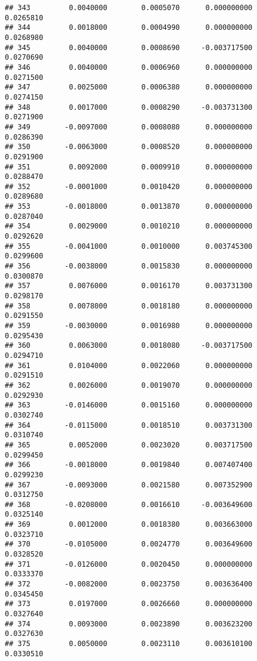 \documentclass[
]{article}
\begin{document}
\begin{verbatim}
## 343         0.0040000        0.0005070      0.000000000             0.0265810
## 344         0.0018000        0.0004990      0.000000000             0.0268980
## 345         0.0040000        0.0008690     -0.003717500             0.0270690
## 346         0.0040000        0.0006960      0.000000000             0.0271500
## 347         0.0025000        0.0006380      0.000000000             0.0274150
## 348         0.0017000        0.0008290     -0.003731300             0.0271900
## 349        -0.0097000        0.0008080      0.000000000             0.0286390
## 350        -0.0063000        0.0008520      0.000000000             0.0291900
## 351         0.0092000        0.0009910      0.000000000             0.0288470
## 352        -0.0001000        0.0010420      0.000000000             0.0289680
## 353        -0.0018000        0.0013870      0.000000000             0.0287040
## 354         0.0029000        0.0010210      0.000000000             0.0292620
## 355        -0.0041000        0.0010000      0.003745300             0.0299600
## 356        -0.0038000        0.0015830      0.000000000             0.0300870
## 357         0.0076000        0.0016170      0.003731300             0.0298170
## 358         0.0078000        0.0018180      0.000000000             0.0291550
## 359        -0.0030000        0.0016980      0.000000000             0.0295430
## 360         0.0063000        0.0018080     -0.003717500             0.0294710
## 361         0.0104000        0.0022060      0.000000000             0.0291510
## 362         0.0026000        0.0019070      0.000000000             0.0292930
## 363        -0.0146000        0.0015160      0.000000000             0.0302740
## 364        -0.0115000        0.0018510      0.003731300             0.0310740
## 365         0.0052000        0.0023020      0.003717500             0.0299450
## 366        -0.0018000        0.0019840      0.007407400             0.0299230
## 367        -0.0093000        0.0021580      0.007352900             0.0312750
## 368        -0.0208000        0.0016610     -0.003649600             0.0325140
## 369         0.0012000        0.0018380      0.003663000             0.0323710
## 370        -0.0105000        0.0024770      0.003649600             0.0328520
## 371        -0.0126000        0.0020450      0.000000000             0.0333370
## 372        -0.0082000        0.0023750      0.003636400             0.0345450
## 373         0.0197000        0.0026660      0.000000000             0.0327640
## 374         0.0093000        0.0023890      0.003623200             0.0327630
## 375         0.0050000        0.0023110      0.003610100             0.0330510

\end{verbatim}
\end{document}
